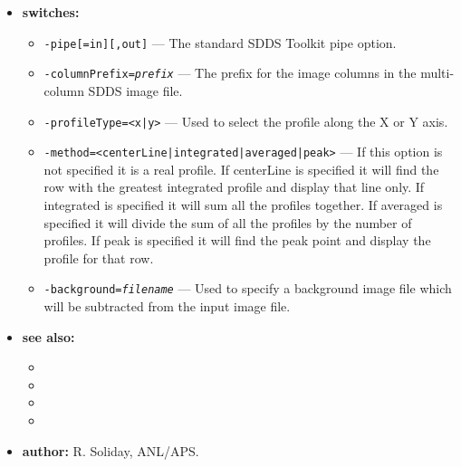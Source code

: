 \begin{itemize}
\item {\bf switches:}
    \begin{itemize}
    \item {\tt -pipe[=in][,out]} --- The standard SDDS Toolkit pipe option.
    \item {\tt -columnPrefix={\em prefix}} --- The prefix for the image columns in the multi-column SDDS image file.
    \item {\tt -profileType=<x|y>} --- Used to select the profile along the X or Y axis.
    \item {\tt -method=<centerLine|integrated|averaged|peak>} --- If this option is not specified it is a real profile. If centerLine is specified it will find the row with the greatest integrated profile and display that line only. If integrated is specified it will sum all the profiles together. If averaged is specified it will divide the sum of all the profiles by the number of profiles. If peak is specified it will find the peak point and display the profile for that row.
    \item {\tt -background={\em filename}} --- Used to specify a background image file which will be subtracted from the input image file.
    \end{itemize}
\item {\bf see also:}
    \begin{itemize}
    \item {}
    \item {}
    \item {}
    \item {}
    \end{itemize}
\item {\bf author:} R. Soliday, ANL/APS.
\end{itemize}

